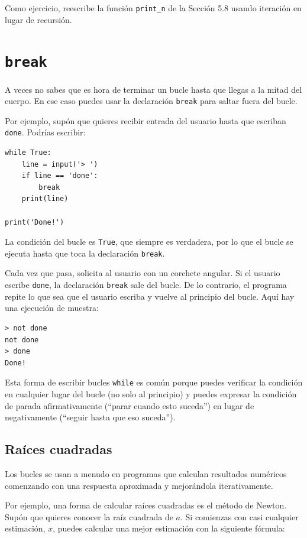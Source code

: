 Como ejercicio, reescribe la función \texttt{print\_n} de la Sección 5.8 usando iteración en lugar de recursión.

\section{\texttt{break}}

A veces no sabes que es hora de terminar un bucle hasta que llegas a la mitad del cuerpo. En ese caso puedes usar la declaración \texttt{break} para saltar fuera del bucle.

Por ejemplo, supón que quieres recibir entrada del usuario hasta que escriban \texttt{done}. Podrías escribir:

\begin{lstlisting}
while True:
    line = input('> ')
    if line == 'done':
        break
    print(line)

print('Done!')
\end{lstlisting}

La condición del bucle es \texttt{True}, que siempre es verdadera, por lo que el bucle se ejecuta hasta que toca la declaración \texttt{break}.

Cada vez que pasa, solicita al usuario con un corchete angular. Si el usuario escribe \texttt{done}, la declaración \texttt{break} sale del bucle. De lo contrario, el programa repite lo que sea que el usuario escriba y vuelve al principio del bucle. Aquí hay una ejecución de muestra:

\begin{lstlisting}
> not done
not done
> done
Done!
\end{lstlisting}

Esta forma de escribir bucles \texttt{while} es común porque puedes verificar la condición en cualquier lugar del bucle (no solo al principio) y puedes expresar la condición de parada afirmativamente (``parar cuando esto suceda'') en lugar de negativamente (``seguir hasta que eso suceda'').

\subsection{Raíces cuadradas}

Los bucles se usan a menudo en programas que calculan resultados numéricos comenzando con una respuesta aproximada y mejorándola iterativamente.

Por ejemplo, una forma de calcular raíces cuadradas es el método de Newton. Supón que quieres conocer la raíz cuadrada de $a$. Si comienzas con casi cualquier estimación, $x$, puedes calcular una mejor estimación con la siguiente fórmula:

